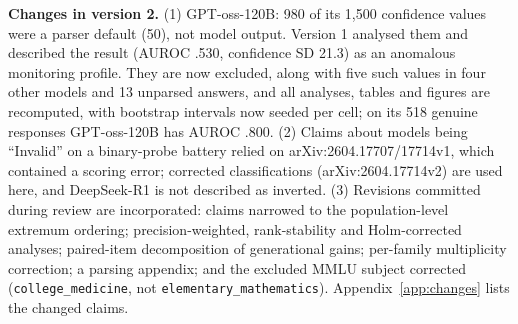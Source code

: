 \documentclass{article}
\begin{document}
\begin{framed}
\noindent\textbf{Changes in version 2.} (1) GPT-oss-120B: 980 of its 1{,}500 confidence values were a parser default (50), not model output. Version 1 analysed them and described the result (AUROC .530, confidence SD 21.3) as an anomalous monitoring profile. They are now excluded, along with five such values in four other models and 13 unparsed answers, and all analyses, tables and figures are recomputed, with bootstrap intervals now seeded per cell; on its 518 genuine responses GPT-oss-120B has AUROC .800. (2) Claims about models being ``Invalid'' on a binary-probe battery relied on arXiv:2604.17707/17714v1, which contained a scoring error; corrected classifications (arXiv:2604.17714v2) are used here, and DeepSeek-R1 is not described as inverted. (3) Revisions committed during review are incorporated: claims narrowed to the population-level extremum ordering; precision-weighted, rank-stability and Holm-corrected analyses; paired-item decomposition of generational gains; per-family multiplicity correction; a parsing appendix; and the excluded MMLU subject corrected (\texttt{college\_medicine}, not \texttt{elementary\_mathematics}). Appendix~\ref{app:changes} lists the changed claims.
\end{framed}






\appendix
\renewcommand{\thetable}{A\arabic{table}}
\renewcommand{\thefigure}{A\arabic{figure}}
\setcounter{table}{0}
\setcounter{figure}{0}
\makeatletter
\renewcommand{\theHtable}{A\arabic{table}}
\renewcommand{\theHfigure}{A\arabic{figure}}
\makeatother


\end{document}
